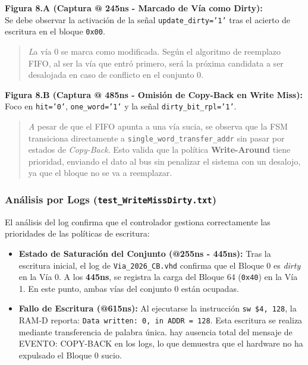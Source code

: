 \documentclass[12pt,a4paper]{article}
\begin{document}
\textbf{Figura 8.A (Captura @ 245ns - Marcado de Vía como Dirty):} \\
Se debe observar la activación de la señal \texttt{update\_dirty='1'} tras el acierto de escritura en el bloque \texttt{0x00}. 
\begin{quote}
    \textit La vía 0 se marca como modificada. Según el algoritmo de reemplazo FIFO, al ser la vía que entró primero, será la próxima candidata a ser desalojada en caso de conflicto en el conjunto 0.
\end{quote}

\textbf{Figura 8.B (Captura @ 485ns - Omisión de Copy-Back en Write Miss):} \\
Foco en \texttt{hit='0'}, \texttt{one\_word='1'} y la señal \texttt{dirty\_bit\_rpl='1'}.
\begin{quote}
    \textit A pesar de que el FIFO apunta a una vía sucia, se observa que la FSM transiciona directamente a \texttt{single\_word\_transfer\_addr} sin pasar por estados de \textit{Copy-Back}. Esto valida que la política \textbf{Write-Around} tiene prioridad, enviando el dato al bus sin penalizar el sistema con un desalojo, ya que el bloque no se va a reemplazar.
\end{quote}

\subsubsection{Análisis por Logs (\texttt{test\_WriteMissDirty.txt})}

El análisis del log confirma que el controlador gestiona correctamente las prioridades de las políticas de escritura:

\begin{itemize}
    \item \textbf{Estado de Saturación del Conjunto (@255ns - 445ns):} Tras la escritura inicial, el log de \texttt{Via\_2026\_CB.vhd} confirma que el Bloque 0 es \textit{dirty} en la Vía 0. A los \textbf{445ns}, se registra la carga del Bloque 64 (\texttt{0x40}) en la Vía 1. En este punto, ambas vías del conjunto 0 están ocupadas.
    \item \textbf{Fallo de Escritura  (@615ns):} Al ejecutarse la instrucción \texttt{sw \$4, 128}, la RAM-D reporta: \texttt{Data written: 0, in ADDR = 128}. Esta escritura se realiza mediante transferencia de palabra única.  hay ausencia total del mensaje de EVENTO: COPY-BACK en los logs, lo que demuestra que el hardware no ha expulsado el Bloque 0 sucio.
\end{itemize}
\end{document}
